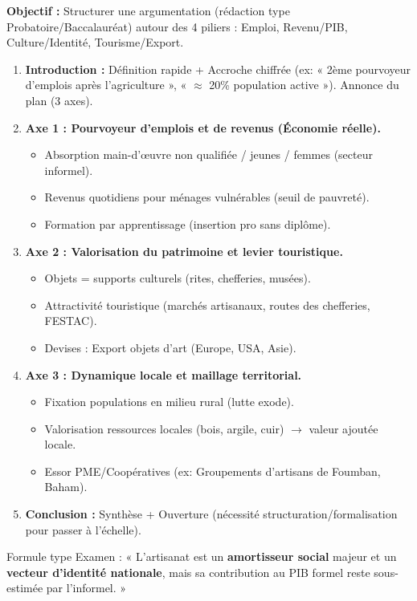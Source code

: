 \documentclass[11pt]{article}
\newcommand{\cle}[1]{{\popxbold\color{popdark}#1}}
\begin{document}
\begin{methode}
\textbf{Objectif :} Structurer une argumentation (rédaction type Probatoire/Baccalauréat) autour des 4 piliers : Emploi, Revenu/PIB, Culture/Identité, Tourisme/Export.
\begin{enumerate}
    \item \textbf{Introduction :} Définition rapide + Accroche chiffrée (ex: « 2ème pourvoyeur d'emplois après l'agriculture », « $\approx$ 20\% population active »). Annonce du plan (3 axes).
    \item \textbf{Axe 1 : Pourvoyeur d'emplois et de revenus (Économie réelle).}
    \begin{itemize}
        \item Absorption main-d'œuvre non qualifiée / jeunes / femmes (secteur informel).
        \item Revenus quotidiens pour ménages vulnérables (seuil de pauvreté).
        \item Formation par apprentissage (insertion pro sans diplôme).
    \end{itemize}
    \item \textbf{Axe 2 : Valorisation du patrimoine et levier touristique.}
    \begin{itemize}
        \item Objets = supports culturels (rites, chefferies, musées).
        \item Attractivité touristique (marchés artisanaux, routes des chefferies, FESTAC).
        \item Devises : Export objets d'art (Europe, USA, Asie).
    \end{itemize}
    \item \textbf{Axe 3 : Dynamique locale et maillage territorial.}
    \begin{itemize}
        \item Fixation populations en milieu rural (lutte exode).
        \item Valorisation ressources locales (bois, argile, cuir) $\rightarrow$ valeur ajoutée locale.
        \item Essor PME/Coopératives (ex: Groupements d'artisans de Foumban, Baham).
    \end{itemize}
    \item \textbf{Conclusion :} Synthèse + Ouverture (nécessité structuration/formalisation pour passer à l'échelle).
\end{enumerate}
\cle{Formule type Examen :} « L'artisanat est un \textbf{amortisseur social} majeur et un \textbf{vecteur d'identité nationale}, mais sa contribution au PIB formel reste sous-estimée par l'informel. »
\end{methode}
\end{document}
